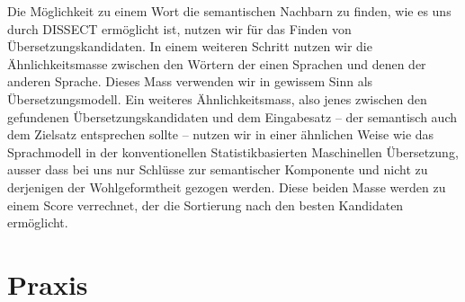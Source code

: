 \documentclass[11pt,twoside,openright]{mpreport}
\begin{document}
Die Möglichkeit zu einem Wort die semantischen Nachbarn zu finden, wie es uns durch DISSECT ermöglicht ist, nutzen wir für das Finden von Übersetzungskandidaten. In einem weiteren Schritt nutzen wir die Ähnlichkeitsmasse zwischen den Wörtern der einen Sprachen und denen der anderen Sprache. Dieses Mass verwenden wir in gewissem Sinn als Übersetzungsmodell.
Ein weiteres Ähnlichkeitsmass, also jenes zwischen den gefundenen Übersetzungskandidaten und dem Eingabesatz -- der semantisch auch dem Zielsatz entsprechen sollte -- nutzen wir in einer ähnlichen Weise wie das Sprachmodell in der konventionellen Statistikbasierten Maschinellen Übersetzung, ausser dass bei uns nur Schlüsse zur semantischer Komponente und nicht zu derjenigen der Wohlgeformtheit gezogen werden. Diese beiden Masse werden zu einem Score verrechnet, der die Sortierung nach den besten Kandidaten ermöglicht.


\chapter{Praxis}
\label{cha:praxis}
\end{document}
